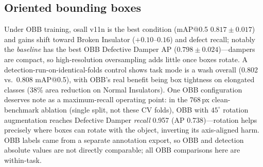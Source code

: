 \documentclass[conference]{IEEEtran}
\makeatletter
\newcommand{\dd}{Defective Damper}
\newcommand{\map}{mAP@0.5}
\makeatother
\begin{document}
\subsection{Oriented bounding boxes}
\label{sec:obb}
Under OBB training, osall v11n is the best condition (\map{} $0.817\pm0.017$) and gains shift toward Broken Insulator ($+0.10$--$0.16$) and defect recall; notably the \emph{baseline} has the best OBB \dd{} AP ($0.798\pm0.024$)---dampers are compact, so high-resolution oversampling adds little once boxes rotate. A detection-run-on-identical-folds control shows task mode is a wash overall (0.802 vs.\ 0.808 \map{}), with OBB's real benefit being box tightness on elongated classes (38\% area reduction on Normal Insulators). One OBB configuration deserves note as a maximum-recall operating point: in the 768\,px clean-benchmark ablation (single split, not these CV folds), OBB with $45^{\circ}$ rotation augmentation reaches \dd{} \emph{recall} 0.957 (AP 0.738)---rotation helps precisely where boxes can rotate with the object, inverting its axis-aligned harm. OBB labels came from a separate annotation export, so OBB and detection absolute values are not directly comparable; all OBB comparisons here are within-task.
\end{document}
